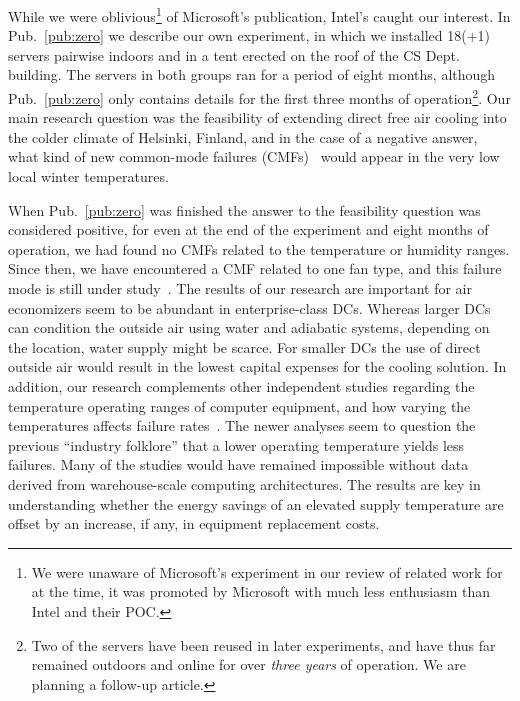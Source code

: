 \documentclass[officiallayout]{tktla}
\begin{document}
While we were oblivious\footnote{We were unaware of Microsoft's experiment in
our review of related work for at the time, it was promoted by Microsoft with
much less enthusiasm than Intel and their POC.} of Microsoft's publication,
Intel's caught our interest. In Pub.~\ref{pub:zero} we describe our own
experiment, in which we installed 18(+1) servers pairwise indoors and in a
tent erected on the roof of the CS Dept. building. The servers in both groups
ran for a period of eight months, although Pub.~\ref{pub:zero} only contains
details for the first three months of operation\footnote{Two of the servers
have been reused in later experiments, and have thus far remained outdoors and
online for over \emph{three years} of operation. We are planning a follow-up
article.}. Our main research question was the feasibility of extending direct
free air cooling into the colder climate of Helsinki, Finland, and in the case
of a negative answer, what kind of new common-mode failures
(CMFs)~\cite{Avizienis2004} would appear in the very low local winter
temperatures.

When Pub.~\ref{pub:zero} was finished the answer to the feasibility question
was considered positive, for even at the end of the experiment and eight
months of operation, we had found no CMFs related to the temperature or
humidity ranges.  Since then, we have encountered a CMF related to one fan
type, and this failure mode is still under study~\cite{Pervila2013}. The
results of our research are important for air economizers seem to be abundant
in enterprise-class DCs. Whereas larger DCs can condition the outside air
using water and adiabatic systems, depending on the location, water supply
might be scarce. For smaller DCs the use of direct outside air would result in
the lowest capital expenses for the cooling solution. In addition, our
research complements other independent studies regarding the temperature
operating ranges of computer equipment, and how varying the temperatures
affects failure
rates~\cite{Elerath2004,Pinheiro2007,Schroeder2007,Schroeder2009,El-sayed2012}.
The newer analyses seem to question the previous ``industry folklore'' that a
lower operating temperature yields less failures. Many of the studies would
have remained impossible without data derived from warehouse-scale computing
architectures. The results are key in understanding whether the energy savings
of an elevated supply temperature are offset by an increase, if any, in
equipment replacement costs.
\end{document}

